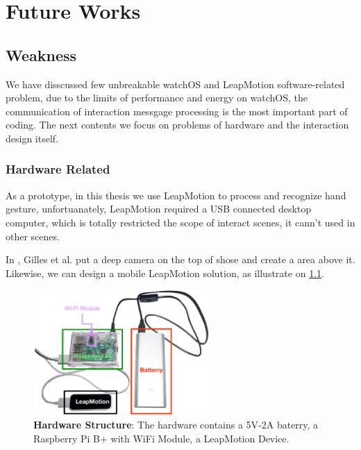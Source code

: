 \chapter{Future Works}

\section{Weakness}


We have disscussed few unbreakable watchOS and LeapMotion software-related problem, due to the limits of performance and energy on watchOS, the communication of interaction messgage processing is the most important part of coding. The next contents we focus on problems of hardware and the interaction design itself.

\subsection{Hardware Related}

As a prototype, in this thesis we use LeapMotion to process and recognize hand gesture, unfortuanately, LeapMotion required a USB connected desktop computer,  which is totally restricted the scope of interact scenes, it cann't used in other scenes.

In \cite{Bailly:2012:SNP:2207676.2208576}, Gilles et al. put a deep camera on the top of shose and create a area above it. Likewise, we can design a mobile LeapMotion solution, as illustrate on \ref{fig:hardware}.

\begin{figure}[H]
    \kaishu
    \centering
    \includegraphics[width=0.6\textwidth]{figures/hardware}
    \caption{\kaishu \textbf{Hardware Structure}: The hardware contains a 5V-2A baterry, a Raspberry Pi B+ with WiFi Module, a LeapMotion Device.}
    \label{fig:hardware}
\end{figure}


